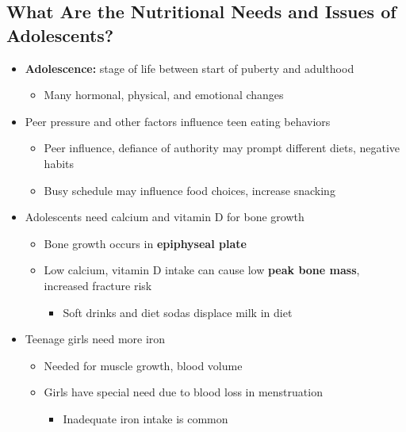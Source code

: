 \documentclass[12pt]{article}
\begin{document}
        \subsection{What Are the Nutritional Needs and Issues of Adolescents?}
            \begin{itemize}
                \item \textbf{Adolescence:} stage of life between start of puberty and adulthood
                    \begin{itemize}
                        \item Many hormonal, physical, and emotional changes
                    \end{itemize}
                \item Peer pressure and other factors influence teen eating behaviors
                    \begin{itemize}
                        \item Peer influence, defiance of authority may prompt different diets, negative habits
                        \item Busy schedule may influence food choices, increase snacking
                    \end{itemize}
                \item Adolescents need calcium and vitamin D for bone growth
                    \begin{itemize}
                        \item Bone growth occurs in \textbf{epiphyseal plate}
                        \item Low calcium, vitamin D intake can cause low \textbf{peak bone mass}, increased fracture risk
                            \begin{itemize}
                                \item Soft drinks and diet sodas displace milk in diet
                            \end{itemize}
                    \end{itemize}
                \item Teenage girls need more iron
                    \begin{itemize}
                        \item Needed for muscle growth, blood volume
                        \item Girls have special need due to blood loss in menstruation
                            \begin{itemize}
                                \item Inadequate iron intake is common

\end{itemize}
\end{itemize}
\end{itemize}
\end{document}
